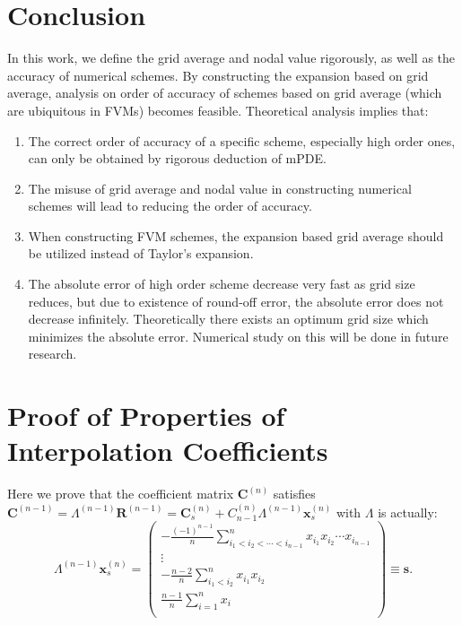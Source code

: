 \documentclass[]{article}
\def\Matrix#1{\left(#1\right)}
\def\Matrix#1{\left(#1\right)}
\begin{document}
\section{Conclusion} \label{sec:conclusion}

In this work, we define the grid average and nodal
value rigorously, as well as the accuracy of numerical schemes. By
constructing the expansion based on grid average, analysis on order of
accuracy of schemes based on grid average (which are ubiquitous in
FVMs) becomes feasible. Theoretical analysis implies that:
\begin{enumerate}
\item The correct order of accuracy of a specific scheme, especially
high order ones, can only be obtained by rigorous deduction of
mPDE.
\item The misuse of grid average and nodal value in constructing numerical
schemes will lead to reducing the order of accuracy. 
\item When constructing FVM schemes, the expansion based grid average
  should be utilized instead of Taylor's expansion.
\item The absolute error of high order scheme decrease very fast as
grid size reduces, but due to existence of round-off error, the
absolute error does not decrease infinitely. Theoretically there
exists an optimum grid size which minimizes the absolute
error. Numerical study on this will be done in future research.

\end{enumerate}





\nocite{*}


\appendix
\section{Proof of Properties of Interpolation Coefficients}\label{sec:proof}
Here we prove that the coefficient matrix $\bm C^{(n)}$ satisfies
$\bm C^{(n-1)}=\Lambda^{(n-1)}\bm R^{(n-1)}=\bm C^{(n)}_s +
C^{(n)}_{n-1}\Lambda^{(n-1)}\bm x_s^{(n)}$ with $\Lambda$ is actually:
\begin{equation}
\Lambda^{(n-1)}\bm x_s^{(n)}=\Matrix{\begin{array}{r} \displaystyle -\frac{(-1)^{n-1}}{n}\sum_{i_1<i_2<\cdots<i_{n-1}}^n x_{i_1}x_{i_2}\cdots x_{i_{n-1}} \\ \vdots\hspace{1cm} \\ \displaystyle -\frac{n-2}{n}\sum_{i_1<i_2}^n x_{i_1}x_{i_2} \\[5mm] \displaystyle \frac{n-1}{n}\sum_{i=1}^n x_i \\ \end{array}}\equiv\bm s. \label{eq:appd-C-n-C-n1-s}
\end{equation}
\end{document}
